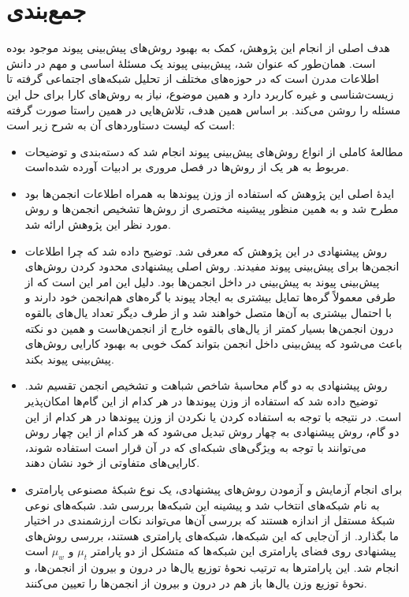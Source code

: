 \section{جمع‌بندی}

هدف اصلی از انجام این پژوهش، کمک به بهبود روش‌های پیش‌بینی پیوند موجود بوده است. همان‌طور که عنوان شد، پیش‌بینی پیوند یک مسئلهٔ اساسی و مهم در دانش اطلاعات مدرن است که در حوزه‌های مختلف از تحلیل شبکه‌های اجتماعی گرفته تا  زیست‌شناسی و غیره کاربرد دارد و همین موضوع، نیاز به روش‌های کارا برای حل این مسئله را روشن می‌کند. بر اساس همین هدف، تلاش‌هایی در همین راستا صورت گرفته است که لیست دستاوردهای آن به شرح زیر است:
\begin{itemize}
  \item مطالعهٔ کاملی از انواع روش‌های پیش‌بینی پیوند انجام شد که دسته‌بندی و توضیحات مربوط به هر یک از روش‌ها در فصل مروری بر ادبیات آورده شده‌است.
  \item ایدهٔ اصلی این پژوهش که استفاده از وزن پیوندها به همراه اطلاعات انجمن‌ها بود مطرح شد و به همین منظور پیشینه مختصری از روش‌ها تشخیص انجمن‌ها و روش مورد نظر این پژوهش ارائه شد.
  \item روش پیشنهادی در این پژوهش که معرفی شد. توضیح داده شد که چرا اطلاعات انجمن‌ها برای پیش‌بینی پیوند مفیدند. روش اصلی پیشنهادی محدود کردن روش‌های پیش‌بینی پیوند به پیش‌بینی در داخل انجمن‌ها بود. دلیل این امر این است که از طرفی معمولاً گره‌ها تمایل بیشتری به ایجاد پیوند با گره‌های هم‌انجمن خود دارند و با احتمال بیشتری به آن‌ها متصل خواهند شد و از طرف دیگر تعداد یال‌های بالقوه درون انجمن‌ها بسیار کمتر از یال‌های بالقوه خارج از انجمن‌هاست و همین دو نکته باعث می‌شود که پیش‌بینی داخل انجمن بتواند کمک خوبی به بهبود کارایی روش‌های پیش‌بینی پیوند بکند.
    \item روش پیشنهادی به دو گام محاسبهٔ شاخص شباهت و تشخیص انجمن تقسیم شد. توضیح داده شد که استفاده از وزن پیوندها در هر کدام از این گام‌ها امکان‌پذیر است. در نتیجه با توجه به استفاده کردن یا نکردن از وزن پیوندها در هر کدام از این دو گام، روش پیشنهادی به چهار روش تبدیل می‌شود که هر کدام از این چهار روش می‌توانند با توجه به ویژگی‌های شبکه‌ای که در آن قرار است استفاده شوند، کارایی‌های متفاوتی از خود نشان دهند.
    \item برای انجام آزمایش و آزمودن روش‌های پیشنهادی، یک نوع شبکهٔ مصنوعی پارامتری به نام شبکه‌های  انتخاب شد و پیشینه این شبکه‌ها بررسی شد. شبکه‌های  نوعی شبکهٔ مستقل از اندازه هستند که بررسی آن‌ها می‌تواند نکات ارزشمندی در اختیار ما بگذارد. از آن‌جایی که این شبکه‌ها، شبکه‌های پارامتری هستند، بررسی روش‌های پیشنهادی روی فضای پارامتری این شبکه‌ها که متشکل از دو پارامتر $\mu_t$ و $\mu_w$ است انجام شد. این پارامترها به ترتیب نحوهٔ توزیع یال‌ها در درون و بیرون از انجمن‌ها، و نحوهٔ توزیع وزن یال‌ها باز هم در درون و بیرون از انجمن‌ها را تعیین می‌کنند.

\end{itemize}

